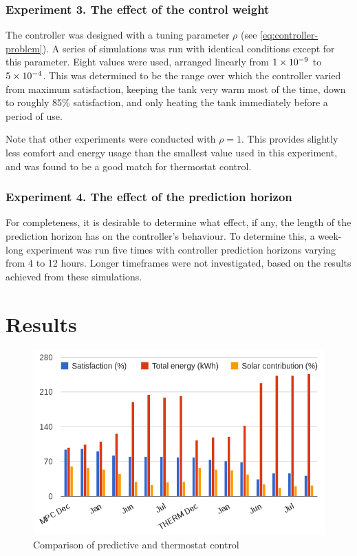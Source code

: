 \subsubsection{Experiment 3. The effect of the control weight}

The controller was designed with a tuning parameter $\rho$ (see \autoref{eq:controller-problem}).
A series of simulations was run with identical conditions except for this parameter.
Eight values were used, arranged linearly from $1\times 10^{-9}$ to $5\times 10^{-4}$.
This was determined to be the range over which the controller varied from maximum satisfaction, keeping the tank very warm most of the time, down to roughly 85\% satisfaction, and only heating the tank immediately before a period of use.

Note that other experiments were conducted with $\rho = 1$.
This provides slightly less comfort and energy usage than the smallest value used in this experiment, and was found to be a good match for thermostat control.

\subsubsection{Experiment 4. The effect of the prediction horizon}

For completeness, it is desirable to determine what effect, if any, the length of the prediction horizon has on the controller's behaviour.
To determine this, a week-long experiment was run five times with controller prediction horizons varying from 4 to 12 hours.
Longer timeframes were not investigated, based on the results achieved from these simulations.

\section{Results}

\begin{figure}
   \centering
   \includegraphics[width=\textwidth]{images/comparison}
   \caption{Comparison of predictive and thermostat control}
   \label{fig:comparison}
\end{figure}

